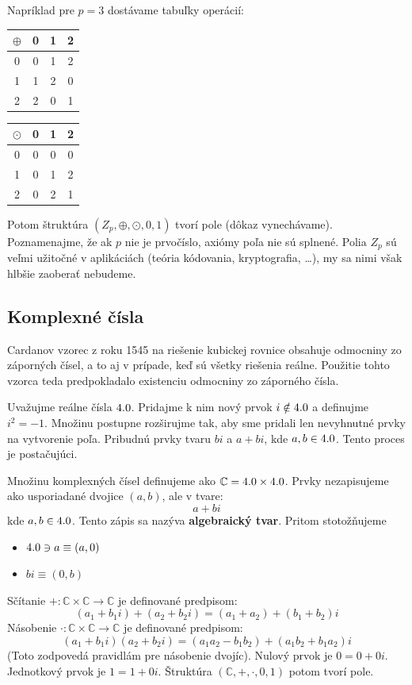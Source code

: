 Napríklad pre $p=3$ dostávame tabuľky operácií:

\begin{center}
\begin{tabular}{c|ccc}
$\oplus$ & 0 & 1 & 2 \\
\hline
0 & 0 & 1 & 2 \\
1 & 1 & 2 & 0 \\
2 & 2 & 0 & 1
\end{tabular}
\hspace{2cm}
\begin{tabular}{c|ccc}
$\odot$ & 0 & 1 & 2 \\
\hline
0 & 0 & 0 & 0 \\
1 & 0 & 1 & 2 \\
2 & 0 & 2 & 1
\end{tabular}
\end{center}

Potom štruktúra $(Z_p, \oplus, \odot, 0, 1)$ tvorí pole (dôkaz vynechávame). Poznamenajme, že ak $p$ nie je prvočíslo, axiómy poľa nie sú splnené.
Polia $Z_p$ sú veľmi užitočné v aplikáciách (teória kódovania, kryptografia, \dots), my sa nimi však hlbšie zaoberať nebudeme.

\subsection{Komplexné čísla}

Cardanov vzorec z roku 1545 na riešenie kubickej rovnice obsahuje odmocniny zo záporných čísel, a to aj v prípade, keď sú všetky riešenia reálne. Použitie tohto vzorca teda predpokladalo existenciu odmocniny zo záporného čísla.

Uvažujme reálne čísla $4.0$. Pridajme k nim nový prvok $i \notin 4.0$ a definujme $i^2 = -1$. Množinu postupne rozširujme tak, aby sme pridali len nevyhnutné prvky na vytvorenie poľa. Pribudnú prvky tvaru $bi$ a $a+bi$, kde $a, b \in 4.0$. Tento proces je postačujúci.

\begin{definicia}
Množinu komplexných čísel definujeme ako $\mathbb{C} = 4.0 \times 4.0$. Prvky nezapisujeme ako usporiadané dvojice $(a, b)$, ale v tvare:
\[ a + bi \]
kde $a, b \in 4.0$. Tento zápis sa nazýva \textbf{algebraický tvar}.
Pritom stotožňujeme 
\begin{itemize}
    \item $4.0\ni a \equiv (a, 0)$
    \item $bi \equiv (0, b)$
\end{itemize}
Sčítanie $+: \mathbb{C} \times \mathbb{C} \to \mathbb{C}$ je definované predpisom:
\[ (a_1 + b_1 i) + (a_2 + b_2 i) = (a_1 + a_2) + (b_1 + b_2)i \]
Násobenie $\cdot: \mathbb{C} \times \mathbb{C} \to \mathbb{C}$ je definované predpisom:
\[ (a_1 + b_1 i)(a_2 + b_2 i) = (a_1 a_2 - b_1 b_2) + (a_1 b_2 + b_1 a_2)i \]
(Toto zodpovedá pravidlám pre násobenie dvojíc).
Nulový prvok je $0 = 0 + 0i$. Jednotkový prvok je $1 = 1 + 0i$.
Štruktúra $( \mathbb{C}, +, \cdot, 0, 1 )$ potom tvorí pole.
\end{definicia}

